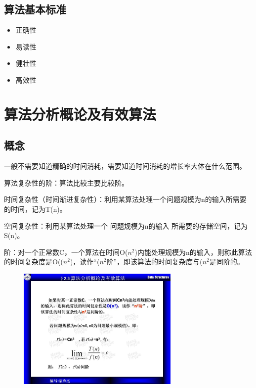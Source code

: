 \documentclass[AutoFakeBold]{LZUThesis2007}
\begin{document}
		\subsection{算法基本标准}
			\begin{itemize}
				\item 正确性
				\item 易读性
				\item 健壮性
				\item 高效性
			\end{itemize}

	\section{算法分析概论及有效算法}
		\subsection{概念}

			一般不需要知道精确的时间消耗，需要知道时间消耗的增长率大体在什么范围。

			算法复杂性的阶：算法比较主要比较阶。

			时间复杂性（时间渐进复杂性）：利用某算法处理一个问题规模为n的输入所需要的时间，记为T(n)。

			空间复杂性：利用某算法处理一个 问题规模为n的输入 所需要的存储空间，记为S(n)。

			阶：对一个正常数C，一个算法在时间Ο($n^{2}$)内能处理规模为n的输入，则称此算法的时间复杂度是Ο(($n^{2}$)，读作“($n^{2}$阶”，即该算法的时间复杂度与($n^{2}$是同阶的。

			\begin{figure}[H]
			    \centering
			    \includegraphics[width=0.7\textwidth]{figures/2.1.jpg}
			    
			    \label{fig_install_texlive}
			\end{figure}
\end{document}
